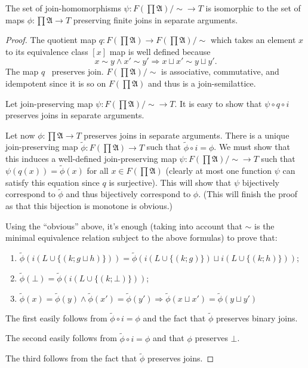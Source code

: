 \begin{lem}
  The set of join-homomorphisms $\psi : F \left( \prod \mathfrak{A} \right) / \sim
  \rightarrow T$ is isomorphic to the set of maps $\phi :
  \prod \mathfrak{A} \rightarrow T$ preserving finite joins in separate arguments.
\end{lem}

\begin{proof}
  The quotient map $q : F \left( \prod \mathfrak{A} \right) \rightarrow F
  \left( \prod \mathfrak{A} \right) / \sim$ which takes an element $x$ to its
  equivalence class $[x]$ map is well defined because
  \[ x \sim y \wedge x' \sim y' \Rightarrow x \sqcup x' \sim y \sqcup y' . \]
  The map $q$ \ preserves join. $F \left( \prod \mathfrak{A} \right) / \sim$
  is associative, commutative, and idempotent since it is so on $F \left(
  \prod \mathfrak{A} \right)$ and thus is a join-semilattice.
  
  Let join-preserving map $\psi : F \left( \prod \mathfrak{A} \right) / \sim
  \rightarrow T$. It is easy to show that $\psi \circ q \circ i$ preserves
  joins in separate arguments.
  
  Let now $\phi : \prod \mathfrak{A} \rightarrow T$ preserves joins in
  separate arguments. There is a unique join-preserving map $\tilde{\phi} : F
  \left( \prod \mathfrak{A} \right) \rightarrow T$ such that $\tilde{\phi}
  \circ i = \phi$. We must show that this induces a well-defined
  join-preserving map $\psi : F \left( \prod \mathfrak{A} \right) / \sim
  \rightarrow T$ such that $\psi (q (x)) = \tilde{\phi} (x)$ for all $x \in F
  \left( \prod \mathfrak{A} \right)$ (clearly at most one function $\psi$ can
  satisfy this equation since $q$ is surjective). This will show that $\psi$
  bijectively correspond to $\tilde{\phi}$ and thus bijectively correspond to
  $\phi$. (This will finish the proof as that this bijection is monotone is
  obvious.)
  
  Using the ``obvious'' above, it's enough (taking into account that $\sim$ is
  the minimal equivalence relation subject to the above formulas) to prove
  that:
  \begin{enumerate}
    \item $\tilde{\phi} (i (L \cup \{ (k ; g \sqcup h) \})) = \tilde{\phi} (i
    (L \cup \{ (k ; g) \}) \sqcup i (L \cup \{ (k ; h) \}))$;
    
    \item $\tilde{\phi} (\bot) = \tilde{\phi} (i (L \cup \{ (k ; \bot) \}))$;
    
    \item $\tilde{\phi} (x) = \tilde{\phi} (y) \wedge \tilde{\phi} (x') =
    \tilde{\phi} (y') \Rightarrow \tilde{\phi} (x \sqcup x') = \tilde{\phi} (y
    \sqcup y')$
  \end{enumerate}
  The first easily follows from $\tilde{\phi} \circ i = \phi$ and the fact
  that $\tilde{\phi}$ preserves binary joins.
  
  The second easily follows from $\tilde{\phi} \circ i = \phi$ and that $\phi$
  preserves $\bot$.
  
  The third follows from the fact that $\tilde{\phi}$ preserves joins.
\end{proof}

